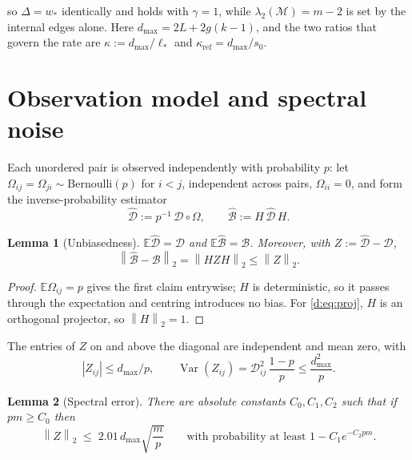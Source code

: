 \documentclass[11pt]{article}
\theoremstyle{plain}
\newtheorem{lemma}{Lemma}
\theoremstyle{definition}
\theoremstyle{remark}
\providecommand{\Dmat}{\mathcal{D}}          %
\providecommand{\Bop}{\mathcal{B}}           %
\providecommand{\Mop}{\mathcal{M}}           %
\providecommand{\1}{\mathbf{1}}
\providecommand{\E}{\mathbb{E}}
\providecommand{\norm}[1]{\left\lVert #1 \right\rVert}
\providecommand{\opnorm}[1]{\norm{#1}_{2}}
\newcommand{\dmax}{d_{\max}}
\newcommand{\wst}{w_{*}}
\begin{document}
\noindent
so $\Delta=\wst$ identically and  holds with $\gamma=1$, while
$\lambda_2(\Mop)=m-2$ is set by the internal edges alone. Here
$\dmax=2L+2g(k-1)$, and the two ratios that govern the rate are
$\kappa:=\dmax/\ell_*$ and $\kappa_{\mathrm{ref}}=\dmax/s_0$.

\section{Observation model and spectral noise}\label{d:sec:noise}

Each unordered pair is observed independently with probability $p$: let
$\Omega_{ij}=\Omega_{ji}\sim\mathrm{Bernoulli}(p)$ for $i<j$, independent across
pairs, $\Omega_{ii}=0$, and form the inverse-probability estimator
\begin{equation}\label{d:eq:ipw}
  \widehat{\Dmat}:=p^{-1}\,\Dmat\circ\Omega,
  \qquad
  \widehat{\Bop}:=H\,\widehat{\Dmat}\,H .
\end{equation}

\begin{lemma}[Unbiasedness]\label{d:lem:unbiased}
$\E\widehat{\Dmat}=\Dmat$ and $\E\widehat{\Bop}=\Bop$. Moreover, with
$Z:=\widehat{\Dmat}-\Dmat$,
\begin{equation}\label{d:eq:proj}
  \opnorm{\widehat{\Bop}-\Bop}=\opnorm{HZH}\le\opnorm{Z}.
\end{equation}
\end{lemma}

\begin{proof}
$\E\Omega_{ij}=p$ gives the first claim entrywise; $H$ is deterministic, so it
passes through the expectation and centring introduces no bias. For
\eqref{d:eq:proj}, $H$ is an orthogonal projector, so $\opnorm{H}=1$.
\end{proof}

The entries of $Z$ on and above the diagonal are independent and mean zero,
with
\begin{equation}\label{d:eq:zbounds}
  |Z_{ij}|\le \dmax/p,
  \qquad
  \operatorname{Var}(Z_{ij})=\Dmat_{ij}^2\,\frac{1-p}{p}\le\frac{\dmax^2}{p}.
\end{equation}

\begin{lemma}[Spectral error]\label{d:lem:opnorm}
There are absolute constants $C_0,C_1,C_2$ such that if $pm\ge C_0$ then
\begin{equation}\label{d:eq:opnorm}
  \opnorm{Z}\;\le\;2.01\,\dmax\sqrt{\frac{m}{p}}
  \qquad\text{with probability at least } 1-C_1e^{-C_2pm}.
\end{equation}
\end{lemma}
\end{document}

